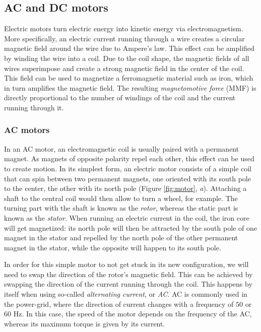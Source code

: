 \subsection{AC and DC motors}

Electric motors turn electric energy into kinetic energy via electromagnetism. More specifically, an electric current running through a wire creates a circular magnetic field around the wire due to Ampere's law. This effect can be amplified by winding the wire into a coil. Due to the coil shape, the magnetic fields of all wires superimpose and create a strong magnetic field in the center of the coil. This field can be used to magnetize a ferromagnetic material such as iron, which in turn amplifies the magnetic field. The resulting \textsl{magnetomotive force} (MMF) is directly proportional to the number of windings of the coil and the current running through it.

\subsubsection{AC motors}

In an AC motor, an electromagnetic coil is usually paired with a permanent magnet. As magnets of opposite polarity repel each other, this effect can be used to create motion. In its simplest form, an electric motor consists of a simple coil that can spin between two permanent magnets, one oriented with its south pole to the center, the other with its north pole (Figure \ref{fig:motor}, \textsl{a}). Attaching a shaft to the central coil would then allow to turn a wheel, for example. The turning part with the shaft is known as the \textsl{rotor}, whereas the static part is known as the \textsl{stator}. When running an electric current in the coil, the iron core will get magnetized: its north pole will then be attracted by the south pole of one magnet in the stator and repelled by the north pole of the other permanent magnet in the stator, while the opposite will happen to its south pole.

In order for this simple motor to not get stuck in its new configuration, we will need to swap the direction of the rotor's magnetic field. This can be achieved by swapping the direction of the current running through the coil. This happens by itself when using so-called \textsl{alternating current}, or \textsl{AC}. AC is commonly used in the power-grid, where the direction of current changes with a frequency of $50$ or $60$ Hz. In this case, the speed of the motor depends on the frequency of the AC, whereas its maximum torque is given by its current.

